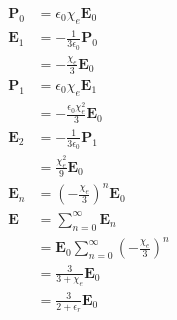 \documentclass{article}
\renewcommand{\vec}[1]{\boldsymbol{\mathbf{#1}}}
\begin{document}
\begin{align*}
  \vec{P}_0 & = \epsilon_0 \chi_e \vec{E}_0                                      \\
  \vec{E}_1 & = -\frac{1}{3 \epsilon_0} \vec{P}_0                                \\
            & = -\frac{\chi_e}{3} \vec{E}_0                                      \\
  \vec{P}_1 & = \epsilon_0 \chi_e \vec{E}_1                                      \\
            & = -\frac{\epsilon_0 \chi_e^2}{3} \vec{E}_0                         \\
  \vec{E}_2 & = -\frac{1}{3 \epsilon_0} \vec{P}_1                                \\
            & = \frac{\chi_e^2}{9} \vec{E}_0                                     \\
  \vec{E}_n & = \left( -\frac{\chi_e}{3} \right)^n \vec{E}_0                     \\
  \vec{E}   & = \sum_{n = 0}^\infty \vec{E}_n                                    \\
            & = \vec{E}_0 \sum_{n = 0}^\infty \left( -\frac{\chi_e}{3} \right)^n \\
            & = \frac{3}{3 + \chi_e} \vec{E}_0                                   \\
            & = \frac{3}{2 + \epsilon_r} \vec{E}_0
\end{align*}

\setcounter{subsection}{25}
\subsection{}
\end{document}
